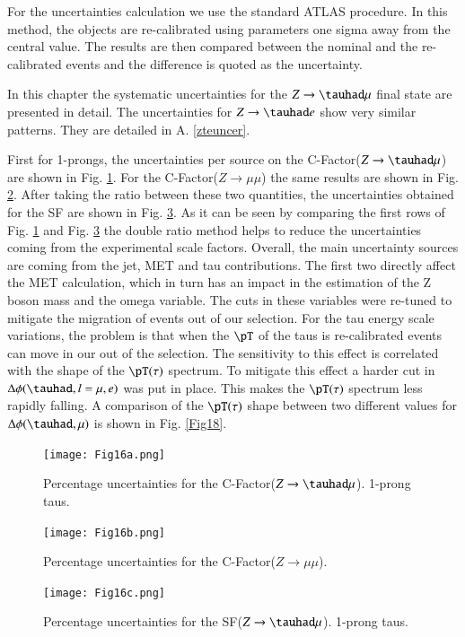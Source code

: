 For the uncertainties calculation we use the standard ATLAS procedure. In this method, the objects are re-calibrated using parameters one sigma away from the central value. The results are then compared between the nominal and the re-calibrated events and the difference is quoted as the uncertainty. 

In this chapter the systematic uncertainties for the $Z\to\tauhad\mu$ final state are presented in detail. The uncertainties for $Z\to\tauhad e$ show very similar patterns. They are detailed in A. \ref{zteuncer}. 

First for 1-prongs, the uncertainties per source on the C-Factor($Z\to\tauhad \mu$) are shown in Fig. \ref{Fig16a}. For the C-Factor($Z\to\mu\mu$) the same results are shown in Fig. \ref{Fig16b}. After taking the ratio between these two quantities, the uncertainties obtained for the SF are shown in Fig. \ref{Fig16c}. As it can be seen by comparing the first rows of Fig. \ref{Fig16a} and Fig. \ref{Fig16c} the double ratio method helps to reduce the uncertainties coming from the experimental scale factors. Overall, the main uncertainty sources are coming from the jet, MET and tau contributions. The first two directly affect the MET calculation, which in turn has an impact in the estimation of the Z boson mass and the omega variable. The cuts in these variables were re-tuned to mitigate the migration of events out of our selection. For the tau energy scale variations, the problem is that when the $\pT$ of the taus is re-calibrated events can move in our out of the selection. The sensitivity to this effect is correlated with the shape of the $\pT(\tau)$ spectrum. To mitigate this effect a harder cut in $\Delta\phi(\tauhad ,l=\mu , e)$ was put in place. This makes the $\pT(\tau)$ spectrum less rapidly falling. A comparison of the $\pT(\tau)$ shape between two different values for $\Delta\phi(\tauhad ,\mu)$ is shown in Fig. \ref{Fig18}.    

\begin{figure}[htbp]
	\centering
	\texttt{[image: Fig16a.png]}
	\caption{Percentage uncertainties for the C-Factor($Z\to\tauhad\mu$). 1-prong taus.}
	\label{Fig16a}
\end{figure}
\begin{figure}[htbp]
	\centering
	\texttt{[image: Fig16b.png]}
	\caption{Percentage uncertainties for the C-Factor($Z\to\mu\mu$).}
	\label{Fig16b}
\end{figure}
\begin{figure}[htbp]
	\centering
	\texttt{[image: Fig16c.png]}
	\caption{Percentage uncertainties for the SF($Z\to\tauhad\mu$). 1-prong taus.}
	\label{Fig16c}
\end{figure}

